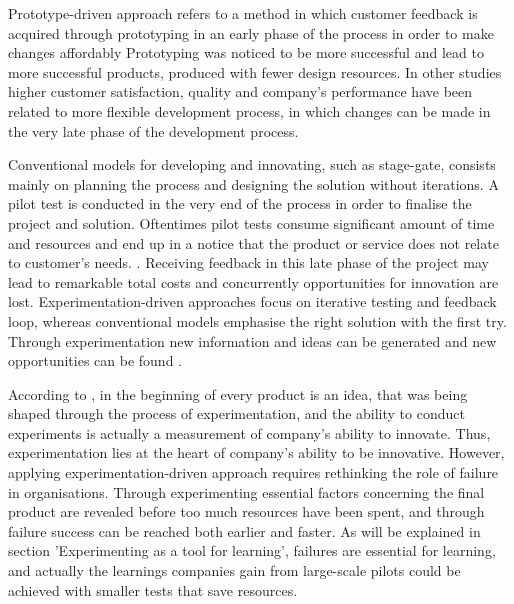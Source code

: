 Prototype-driven approach refers to a method in which customer feedback is acquired through prototyping in an early phase of the process in order to make changes affordably
Prototyping was noticed to be more successful and lead to more successful products, produced with fewer design resources. In other studies higher customer satisfaction, quality and company's performance have been related to more flexible development process, in which changes can be made in the very late phase of the development process. \citep{thomke1998agile}

Conventional models for developing and innovating, such as stage-gate, consists mainly on planning the process and designing the solution without iterations. A pilot test is conducted in the very end of the process in order to finalise the project and solution. Oftentimes pilot tests consume significant amount of time and resources and end up in a notice that the product or service does not relate to customer's needs. \citep{schrage1993culture}. Receiving feedback in this late phase of the project may lead to remarkable total costs and concurrently opportunities for innovation are lost. Experimentation-driven approaches focus on iterative testing and feedback loop, whereas conventional models emphasise the right solution with the first try. \citep{thomke2003managing} Through experimentation new information and ideas can be generated and new opportunities can be found \citep{tuulenmaki2011art, mcgrath2010business}. 

According to \citet{thomke2001enlightened}, in the beginning of every product is an idea, that was being shaped through the process of experimentation, and the ability to conduct experiments is actually a measurement of company's ability to innovate. Thus, experimentation lies at the heart of company's ability to be innovative. However, applying experimentation-driven approach requires rethinking the role of failure in organisations. Through experimenting essential factors concerning the final product are revealed before too much resources have been spent, and through failure success can be reached both earlier and faster. \citep{thomke2003r} As will be explained in section 'Experimenting as a tool for learning', failures are essential for learning, and actually the learnings companies gain from large-scale pilots could be achieved with smaller tests that save resources. \citep{anderson2011step}

